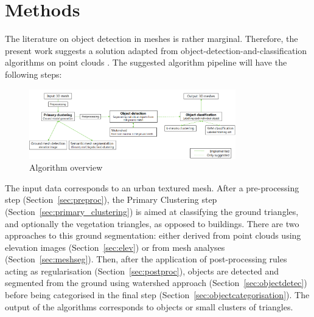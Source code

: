 \documentclass{kththesis}
\begin{document}
\chapter{Methods}
The literature on object detection in meshes is rather marginal. Therefore, the present work suggests a solution adapted from object-detection-and-classification algorithms on point clouds \parencite{HernandezArtefacts, det_seg_class, Finnish3Dpc}. 
The suggested algorithm pipeline will have the following steps: \\
\begin{figure}[H]
\includegraphics[width=0.8\textwidth]{images/algorithm_overview.png}
\caption{Algorithm overview}
\end{figure}

%

The input data corresponds to an urban textured mesh.  After a pre-processing step (Section~\ref{sec:preproc}), the Primary Clustering step (Section~\ref{sec:primary_clustering}) is aimed at classifying the ground triangles, and optionally the vegetation triangles, as opposed to buildings. There are two approaches to this ground segmentation: either derived from point clouds using elevation images (Section~\ref{sec:elev}) or from mesh analyses (Section~\ref{sec:meshseg}). Then, after the application of post-processing rules acting as regularisation (Section~\ref{sec:postproc}), objects are detected and segmented from the ground using  watershed approach (Section~\ref{sec:objectdetec}) before being categorised in the final step (Section~\ref{sec:objectcategorisation}). The output of the algorithms corresponds to objects or small clusters of triangles. 
\end{document}
